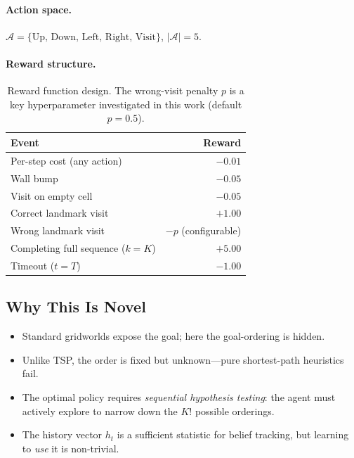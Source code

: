 \documentclass[11pt,a4paper]{article}
\begin{document}
\paragraph{Action space.}
$\mathcal{A} = \{\text{Up, Down, Left, Right, Visit}\}$, $|\mathcal{A}|=5$.

\paragraph{Reward structure.}

\begin{table}[H]
\centering
\begin{tabular}{lr}
\toprule
\textbf{Event} & \textbf{Reward} \\
\midrule
Per-step cost (any action)           & $-0.01$ \\
Wall bump                            & $-0.05$ \\
Visit on empty cell                  & $-0.05$ \\
Correct landmark visit               & $+1.00$ \\
Wrong landmark visit                 & $-p$ (configurable) \\
Completing full sequence ($k=K$)     & $+5.00$ \\
Timeout ($t = T$)                    & $-1.00$ \\
\bottomrule
\end{tabular}
\caption{Reward function design. The wrong-visit penalty $p$ is a key hyperparameter investigated in this work (default $p=0.5$).}
\label{tab:rewards}
\end{table}

\subsection{Why This Is Novel}

\begin{itemize}[nosep]
  \item Standard gridworlds expose the goal; here the goal-ordering is hidden.
  \item Unlike TSP, the order is fixed but unknown---pure shortest-path
        heuristics fail.
  \item The optimal policy requires \emph{sequential hypothesis testing}:
        the agent must actively explore to narrow down the $K!$ possible
        orderings.
  \item The history vector $h_t$ is a sufficient statistic for belief
        tracking, but learning to \emph{use} it is non-trivial.
\end{itemize}
\end{document}
